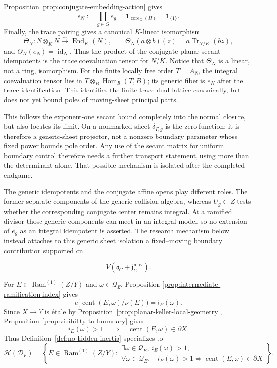 \documentclass[11pt]{article}
\theoremstyle{remark}
\theoremstyle{definition}
\DeclareMathOperator{\Ram}{Ram}
\DeclareMathOperator{\core}{core}
\begin{document}
Proposition
\ref{prop:conjugate-embedding-action} gives
\[
  e_N:=\prod_{g\in G}e_g
  =\mathbf1_{\core_G(H)}
  =\mathbf1_{\{1\}}.
\]
Finally, the trace pairing gives a canonical \(K\)-linear isomorphism
\[
  \Theta_N:N\otimes_KN\xrightarrow{\sim}\operatorname{End}_K(N),
  \qquad
  \Theta_N(a\otimes b)(z)=a\operatorname{Tr}_{N/K}(bz),
\]
and \(\Theta_N(e_N)=\operatorname{id}_N\).  Thus the product of the
conjugate planar secant idempotents is the trace coevaluation tensor for
\(N/K\).  Notice that \(\Theta_N\) is a linear, not a ring, isomorphism.
For the finite locally free order \(T=A_N\), the integral coevaluation tensor
lies in \(T\otimes_B\operatorname{Hom}_B(T,B)\); its generic fiber is
\(e_N\) after the trace identification.  This identifies the finite
trace-dual lattice canonically, but does not yet bound poles of moving-sheet
principal parts.

This follows the exponent-one secant bound completely into the normal
closure, but also locates its limit.  On a nonmarked sheet
\(\delta_{F,g}\) is the zero function; it is therefore a generic-sheet
projector, not a nonzero boundary parameter whose fixed power bounds pole
order.  Any use of the secant matrix for uniform boundary control therefore
needs a further transport statement, using more than the determinant alone.
That possible mechanism is isolated after the completed endgame.

The generic idempotents and the conjugate affine opens play different
roles.  The former separate components of the generic collision algebra,
whereas \(U_g\subset Z\) tests whether the corresponding conjugate center
remains integral.  At a ramified divisor those generic components can meet
in an integral model, so no extension of \(e_g\) as an integral idempotent is
asserted.  The research mechanism below instead attaches to this generic
sheet isolation a fixed--moving boundary contribution supported on

\[
  V\!\left(\mathfrak a_C+\mathfrak j_C^{\mathrm{mov}}\right).
\]

For \(E\in\Ram^{(1)}(Z/Y)\) and
\(\omega\in\mathcal Q_E\), Proposition
\ref{prop:intermediate-ramification-index} gives
\[
  e\bigl(\operatorname{cent}(E,\omega)/\nu(E)\bigr)=i_E(\omega).
\]
Since \(X\to Y\) is \'etale by
Proposition~\ref{prop:planar-keller-local-geometry},
Proposition~\ref{prop:visibility-to-boundary} gives
\[
  i_E(\omega)>1
  \quad\Longrightarrow\quad
  \operatorname{cent}(E,\omega)\in\partial X.
\]
Thus Definition~\ref{def:no-hidden-inertia} specializes to
\[
  \mathcal H(\mathcal D_F)
  =
  \left\{
  E\in\Ram^{(1)}(Z/Y):
  \begin{array}{l}
    \exists\omega\in\mathcal Q_E,\ i_E(\omega)>1,\\
    \forall\omega\in\mathcal Q_E,\quad
      i_E(\omega)>1
      \Longrightarrow
      \operatorname{cent}(E,\omega)\in\partial X
  \end{array}
  \right\}.
\]
\end{document}

